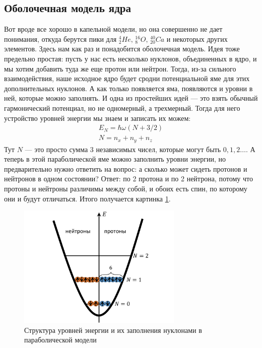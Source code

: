 \documentclass[12pt]{article}
\begin{document}
\subsection{Оболочечная модель ядра}
Вот вроде все хорошо в капельной модели, но она совершенно не дает понимания, откуда берутся пики для ${}^4_2He,\, {}^{16}_8O, \, {}^{40}_{20}Ca$ и некоторых других элементов. Здесь нам как раз и понадобится оболочечная модель. Идея тоже предельно простая: пусть у нас есть несколько нуклонов, объединенных  в ядро, и мы хотим добавить туда же еще протон или нейтрон. Тогда, из-за сильного взаимодействия, наше исходное ядро будет сродни потенциальной яме для этих дополнительных нуклонов. А как только появляется яма, появляются и уровни в ней, которые можно заполнять. И одна из простейших идей --- это взять обычный гармонический потенциал, но не одномерный, а трехмерный. Тогда для него устройство уровней энергии мы знаем и записать их можем:
\begin{gather*}
    E_N=\hbar \omega (N+3/2)\\
    N=n_x+n_y+n_z
\end{gather*}
Тут $N$ --- это просто сумма 3 независимых чисел, которые могут быть $0, 1, 2\dots$. А теперь в этой параболической яме можно заполнить уровни энергии, но предварительно нужно ответить на вопрос: а сколько может сидеть протонов и нейтронов  в одном состоянии? Ответ: по 2 протона и по 2 нейтрона, потому что протоны и нейтроны различимы между собой, и обоих есть спин, по которому они и будут отличаться. Итого получается картинка \ref{fig:sem_09_parabol_pot}.
\begin{figure}[h]
    \centering
    \includegraphics[width=0.7\textwidth,height=\textheight,keepaspectratio]{Seminar_09/pics/pic_parabol_pot.pdf}
    \caption{Структура уровней энергии и их заполнения нуклонами в параболической модели}
    \label{fig:sem_09_parabol_pot}
\end{figure}
\end{document}
